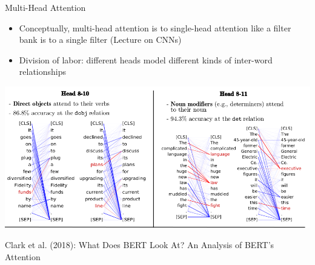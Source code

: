 \begin{vbframe}{Multi-Head Attention}

\vfill

\begin{itemize}
\item Conceptually, multi-head attention is to single-head attention like a filter bank is to a single filter (Lecture on CNNs)
\item Division of labor: different heads model different kinds of inter-word relationships
\end{itemize}
\begin{center}
\includegraphics[width=.9\textwidth]{figure/heads}

{\tiny Clark et al. (2018): What Does BERT Look At? An Analysis of BERT’s Attention}
\end{center}

\vfill

\end{vbframe}


\endlecture



\begin{vbframe}{}

\vfill



\vfill

\end{vbframe}
